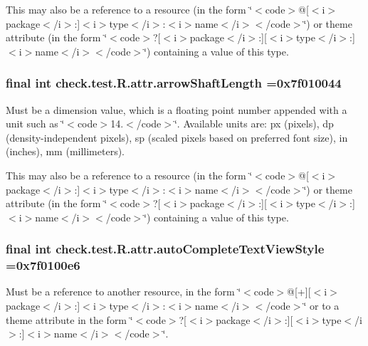 This may also be a reference to a resource (in the form \char`\"{}$<$code$>$@\mbox{[}$<$i$>$package$<$/i$>$\+:\mbox{]}$<$i$>$type$<$/i$>$\+:$<$i$>$name$<$/i$>$$<$/code$>$\char`\"{}) or theme attribute (in the form \char`\"{}$<$code$>$?\mbox{[}$<$i$>$package$<$/i$>$\+:\mbox{]}\mbox{[}$<$i$>$type$<$/i$>$\+:\mbox{]}$<$i$>$name$<$/i$>$$<$/code$>$\char`\"{}) containing a value of this type. \hypertarget{classcheck_1_1test_1_1_r_1_1attr_a42ef32908e93c3a8cc585d62eb217255}{}
\subsubsection[{arrow\+Shaft\+Length}]{\setlength{\rightskip}{0pt plus 5cm}final int check.\+test.\+R.\+attr.\+arrow\+Shaft\+Length =0x7f010044\hspace{0.3cm}{\ttfamily [static]}}\label{classcheck_1_1test_1_1_r_1_1attr_a42ef32908e93c3a8cc585d62eb217255}
Must be a dimension value, which is a floating point number appended with a unit such as \char`\"{}$<$code$>$14.\+5sp$<$/code$>$\char`\"{}. Available units are\+: px (pixels), dp (density-\/independent pixels), sp (scaled pixels based on preferred font size), in (inches), mm (millimeters). 

This may also be a reference to a resource (in the form \char`\"{}$<$code$>$@\mbox{[}$<$i$>$package$<$/i$>$\+:\mbox{]}$<$i$>$type$<$/i$>$\+:$<$i$>$name$<$/i$>$$<$/code$>$\char`\"{}) or theme attribute (in the form \char`\"{}$<$code$>$?\mbox{[}$<$i$>$package$<$/i$>$\+:\mbox{]}\mbox{[}$<$i$>$type$<$/i$>$\+:\mbox{]}$<$i$>$name$<$/i$>$$<$/code$>$\char`\"{}) containing a value of this type. \hypertarget{classcheck_1_1test_1_1_r_1_1attr_a13adeb4de5114ee80c3d327c3cde8692}{}
\subsubsection[{auto\+Complete\+Text\+View\+Style}]{\setlength{\rightskip}{0pt plus 5cm}final int check.\+test.\+R.\+attr.\+auto\+Complete\+Text\+View\+Style =0x7f0100e6\hspace{0.3cm}{\ttfamily [static]}}\label{classcheck_1_1test_1_1_r_1_1attr_a13adeb4de5114ee80c3d327c3cde8692}
Must be a reference to another resource, in the form \char`\"{}$<$code$>$@\mbox{[}+\mbox{]}\mbox{[}$<$i$>$package$<$/i$>$\+:\mbox{]}$<$i$>$type$<$/i$>$\+:$<$i$>$name$<$/i$>$$<$/code$>$\char`\"{} or to a theme attribute in the form \char`\"{}$<$code$>$?\mbox{[}$<$i$>$package$<$/i$>$\+:\mbox{]}\mbox{[}$<$i$>$type$<$/i$>$\+:\mbox{]}$<$i$>$name$<$/i$>$$<$/code$>$\char`\"{}. \hypertarget{classcheck_1_1test_1_1_r_1_1attr_a5de53cfcc8516df6498e3a9365fccecb}{}
